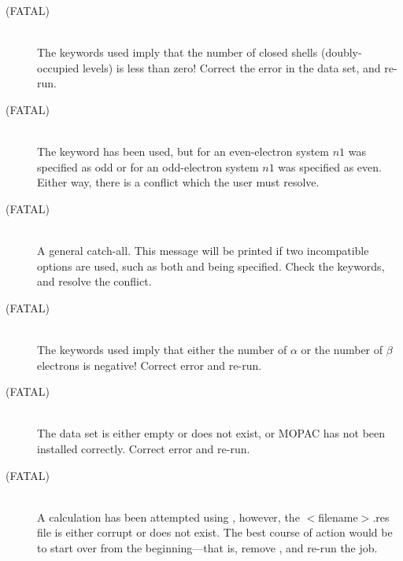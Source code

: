 \begin{description}
\item[ (FATAL)]~\\
The keywords used imply that the number of closed shells (doubly-occupied
levels) is less than zero!  Correct the error in the data set, and re-run.

\item[ (FATAL)]~\\
The keyword  has been used,   but  for  an 
even-electron system  $n1$  was  specified  as  odd or for an odd-electron
system $n1$ was specified as even.  Either way, there is a conflict which the
user  must resolve.

\item[ (FATAL)]~\\
A  general  catch-all.   This  message  will  be  printed  if   two
incompatible  options  are  used,  such  as  both    and 
being specified.  Check the keywords, and resolve the conflict.

\item[ (FATAL)]~\\
The keywords used imply that either the number of $\alpha$ or the number
of $\beta$ electrons is negative!  Correct error and re-run.

\item[ (FATAL)]~\\
The data set is either empty or does not exist, or MOPAC has not been
installed correctly.  Correct error and re-run.

\item[ (FATAL)]~\\
A  calculation has been attempted using , however,
the $<$filename$>$.res file is either corrupt or does not exist.
The best course of action would be to start over from the beginning---that
is, remove , and re-run the job.


\end{description}

